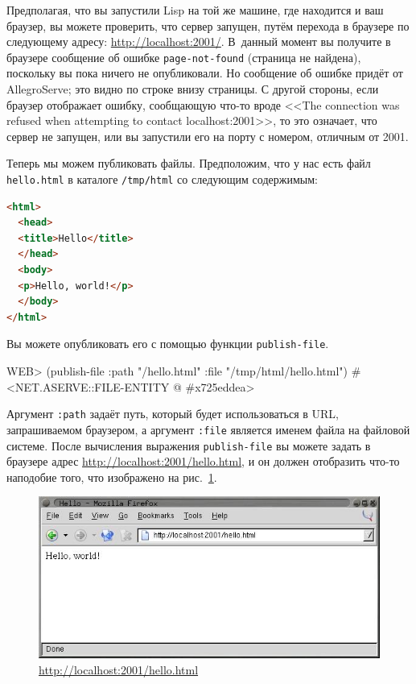 Предполагая, что вы запустили Lisp на той же машине, где находится и ваш браузер, вы
можете проверить, что сервер запущен, путём перехода в браузере по следующему адресу:
\url{http://localhost:2001/}. В~данный момент вы получите в браузере сообщение об ошибке
\lstinline{page-not-found} (страница не найдена), поскольку вы пока ничего не опубликовали. Но
сообщение об ошибке придёт от AllegroServe; это видно по строке внизу страницы. С другой
стороны, если браузер отображает ошибку, сообщающую что-то вроде <<The connection was
refused when attempting to contact localhost:2001>>, то это означает, что сервер не
запущен, или вы запустили его на порту с номером, отличным от 2001.

Теперь мы можем публиковать файлы. Предположим, что у нас есть файл \lstinline{hello.html} в
каталоге \lstinline{/tmp/html} со следующим содержимым:

\begin{lstlisting}[language=HTML]
<html>
  <head>
  <title>Hello</title>
  </head>
  <body>
  <p>Hello, world!</p>
  </body>
</html>
\end{lstlisting}

Вы можете опубликовать его с помощью функции \lstinline{publish-file}.

\begin{myverb}
WEB> (publish-file :path "/hello.html" :file "/tmp/html/hello.html")
#<NET.ASERVE::FILE-ENTITY @ #x725eddea>
\end{myverb}

Аргумент \lstinline{:path} задаёт путь, который будет использоваться в URL, запрашиваемом
браузером, а аргумент \lstinline{:file} является именем файла на файловой системе. После
вычисления выражения \lstinline{publish-file} вы можете задать в браузере адрес
\url{http://localhost:2001/hello.html}, и он должен отобразить что-то наподобие того, что
изображено на рис.~\ref{fig:26-2}.

\begin{figure}[htb]
  \centering
  \includegraphics[scale=0.7]{images/hello-world.jpg}
  \caption{\url{http://localhost:2001/hello.html}}
  \label{fig:26-2}
\end{figure}


